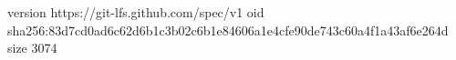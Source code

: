 version https://git-lfs.github.com/spec/v1
oid sha256:83d7cd0ad6c62d6b1c3b02c6b1e84606a1e4cfe90de743c60a4f1a43af6e264d
size 3074
